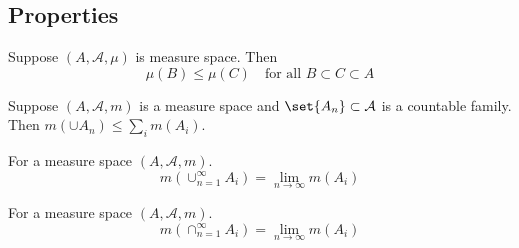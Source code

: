 \subsection*{Properties}

\begin{proposition}[monotonicity]
Suppose $(A, \mathcal{A} , \mu )$ is measure space.
Then
\[
\mu (B) \leq \mu (C) \quad \text{for all } B \subset C \subset A
\]
\end{proposition}

\begin{proposition}[subaddivity]
Suppose $(A, \mathcal{A} , m)$ is a measure space and $\set{A_n} \subset \mathcal{A} $ is a countable family.
Then $m(\cup A_n) \leq \sum_{i} m(A_i)$.
\end{proposition}

\begin{proposition}
For a measure space $(A, \mathcal{A} , m)$.
\[
m(\cup_{n = 1}^{\infty} A_i) = \lim_{n \to \infty} m(A_i)
\]
\end{proposition}

\begin{proposition}
For a measure space $(A, \mathcal{A} , m)$.
\[
m(\cap _{n = 1}^{\infty} A_i) = \lim_{n \to \infty} m(A_i)
\]
\end{proposition}
